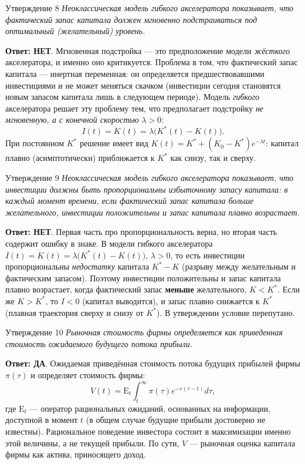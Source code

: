 \documentclass[10pt,a4paper]{article}
\newcommand{\qda}{\textbf{\color{yesgreen}Ответ: ДА}}
\newcommand{\qnet}{\textbf{\color{nored}Ответ: НЕТ}}
\newenvironment{answer}[2]{%
  \begin{qbox}{Утверждение #1}
  \textit{#2}\par\smallskip
}{%
  \end{qbox}\vspace{2pt}
}
\begin{document}
\begin{answer}{8}{Неоклассическая модель гибкого акселератора показывает, что фактический запас капитала должен мгновенно подстраиваться под оптимальный (желательный) уровень.}
\qnet. Мгновенная подстройка --- это предположение модели \emph{жёсткого} акселератора, и именно оно критикуется. Проблема в том, что фактический запас капитала --- инертная переменная: он определяется предшествовавшими инвестициями и не может меняться скачком (инвестиции сегодня становятся новым запасом капитала лишь в следующем периоде). Модель \emph{гибкого} акселератора решает эту проблему тем, что предполагает подстройку \emph{не мгновенную, а с конечной скоростью} $\lambda>0$:
\[
I(t)=\dot K(t)=\lambda\bigl(K^*(t)-K(t)\bigr).
\]
При постоянном $K^*$ решение имеет вид $K(t)=K^*+(K_0-K^*)e^{-\lambda t}$: капитал плавно (асимптотически) приближается к $K^*$ как снизу, так и сверху.
\end{answer}

\begin{answer}{9}{Неоклассическая модель гибкого акселератора показывает, что инвестиции должны быть пропорциональны избыточному запасу капитала: в каждый момент времени, если фактический запас капитала больше желательного, инвестиции положительны и запас капитала плавно возрастает.}
\qnet. Первая часть про пропорциональность верна, но вторая часть содержит ошибку в знаке. В модели гибкого акселератора $I(t)=\dot K(t)=\lambda\bigl(K^*(t)-K(t)\bigr)$, $\lambda>0$, то есть инвестиции пропорциональны \emph{недостатку} капитала $K^*-K$ (разрыву между желательным и фактическим запасом). Поэтому инвестиции положительны и запас капитала плавно возрастает, когда фактический запас \textbf{меньше} желательного, $K<K^*$. Если же $K>K^*$, то $I<0$ (капитал выводится), и запас плавно снижается к $K^*$ (плавная траектория сверху и снизу от $K^*$). В утверждении условие перепутано.
\end{answer}

\begin{answer}{10}{Рыночная стоимость фирмы определяется как приведенная стоимость ожидаемого будущего потока прибыли.}
\qda. Ожидаемая приведённая стоимость потока будущих прибылей фирмы $\pi(\tau)$ и определяет стоимость фирмы:
\[
V(t)=\mathrm{E}_t\int_t^\infty \pi(\tau)e^{-r(\tau-t)}d\tau,
\]
где $\mathrm{E}_t$ --- оператор рациональных ожиданий, основанных на информации, доступной в момент $t$ (в общем случае будущие прибыли достоверно не известны). Рациональное поведение инвестора состоит в максимизации именно этой величины, а не текущей прибыли. По сути, $V$ --- рыночная оценка капитала фирмы как актива, приносящего доход.
\end{answer}
\end{document}
